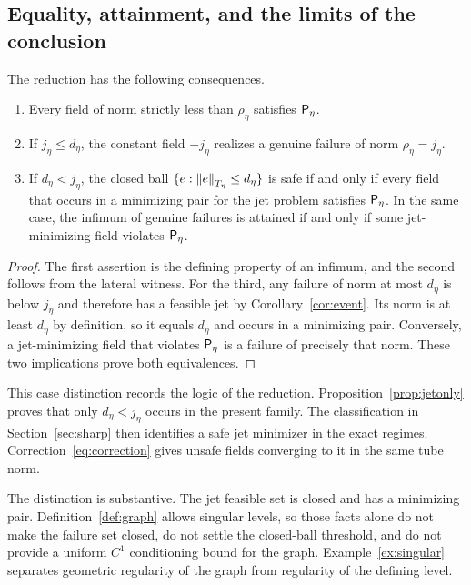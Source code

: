 \documentclass[11pt,a4paper]{article}
\begin{document}
\subsection{Equality, attainment, and the limits of the conclusion}
\label{sec:threshold}

\begin{proposition}\label{prop:attainment}
The reduction has the following consequences.
\begin{enumerate}
\item Every field of norm strictly less than $\rho_\eta$ satisfies
      $\mathsf P_\eta$.
\item If $j_\eta\le d_\eta$, the constant field $-j_\eta$ realizes
      a genuine failure of norm $\rho_\eta=j_\eta$.
\item If $d_\eta<j_\eta$, the closed ball
      $\{e:\left\lVert e\right\rVert_{T_\eta}\le d_\eta\}$ is safe if and only if every
      field that occurs in a minimizing pair for the jet problem satisfies
      $\mathsf P_\eta$. In the same case, the infimum of genuine failures is attained
      if and only if some jet-minimizing field violates $\mathsf P_\eta$.
\end{enumerate}
\end{proposition}
\begin{proof}
The first assertion is the defining property of an infimum, and the
second follows from the lateral witness. For the third, any failure of
norm at most $d_\eta$ is below $j_\eta$ and therefore has a feasible
jet by Corollary~\ref{cor:event}. Its norm is at least $d_\eta$ by
definition, so it equals $d_\eta$ and occurs in a minimizing pair.
Conversely, a jet-minimizing field that violates $\mathsf P_\eta$ is a failure
of precisely that norm. These two implications prove both equivalences.
\end{proof}

This case distinction records the logic of the reduction.
Proposition~\ref{prop:jetonly} proves that only $d_\eta<j_\eta$
occurs in the present family. The classification in
Section~\ref{sec:sharp} then identifies a safe jet minimizer in the exact
regimes. Correction~\eqref{eq:correction} gives unsafe fields converging
to it in the same tube norm.

The distinction is substantive. The jet feasible set is closed and has
a minimizing pair. Definition~\ref{def:graph} allows singular levels,
so those facts alone do not make the failure set closed, do not settle
the closed-ball threshold, and do not provide a uniform $C^1$ conditioning
bound for the graph. Example~\ref{ex:singular} separates geometric
regularity of the graph from regularity of the defining level.
\end{document}
